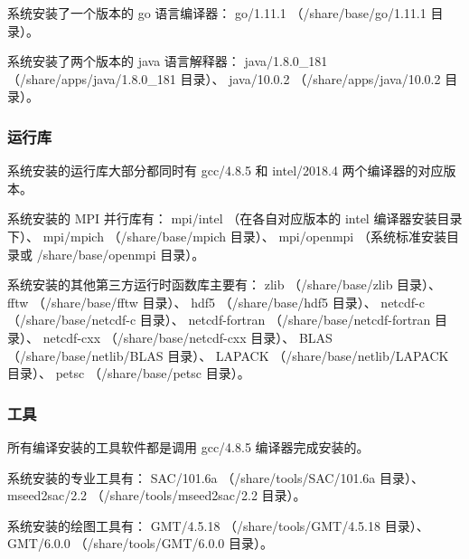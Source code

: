\documentclass[UTF8]{ctexart}
\begin{document}
系统安装了一个版本的 go 语言编译器：\newline
go/1.11.1 （/share/base/go/1.11.1 目录）。
\bigskip

系统安装了两个版本的 java 语言解释器：\newline
java/1.8.0\_181 （/share/apps/java/1.8.0\_181 目录）、\newline
java/10.0.2 （/share/apps/java/10.0.2 目录）。

\subsubsection{运行库}
系统安装的运行库大部分都同时有 gcc/4.8.5 和 intel/2018.4 两个编译器的对应版本。
\bigskip

系统安装的 MPI 并行库有：\newline
mpi/intel （在各自对应版本的 intel 编译器安装目录下）、\newline
mpi/mpich （/share/base/mpich 目录）、\newline
mpi/openmpi （系统标准安装目录或 /share/base/openmpi 目录）。
\bigskip

系统安装的其他第三方运行时函数库主要有：\newline
zlib （/share/base/zlib 目录）、\newline
fftw （/share/base/fftw 目录）、\newline
hdf5 （/share/base/hdf5 目录）、\newline
netcdf-c （/share/base/netcdf-c 目录）、\newline
netcdf-fortran （/share/base/netcdf-fortran 目录）、\newline
netcdf-cxx （/share/base/netcdf-cxx 目录）、\newline
BLAS （/share/base/netlib/BLAS 目录）、\newline
LAPACK （/share/base/netlib/LAPACK 目录）、\newline
petsc （/share/base/petsc 目录）。

\subsubsection{工具}
所有编译安装的工具软件都是调用 gcc/4.8.5 编译器完成安装的。
\bigskip

系统安装的专业工具有：\newline
SAC/101.6a （/share/tools/SAC/101.6a 目录）、\newline
mseed2sac/2.2 （/share/tools/mseed2sac/2.2 目录）。
\bigskip

系统安装的绘图工具有：\newline
GMT/4.5.18 （/share/tools/GMT/4.5.18 目录）、\newline
GMT/6.0.0 （/share/tools/GMT/6.0.0 目录）。
\bigskip
\end{document}
